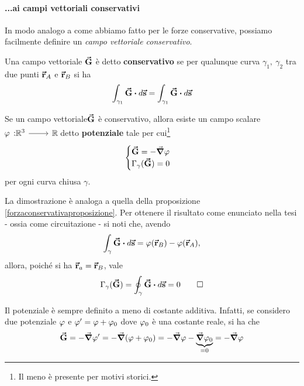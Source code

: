 \paragraph{...ai campi vettoriali conservativi}
In modo analogo a come abbiamo fatto per le forze conservative, possiamo facilmente definire un \textit{campo vettoriale conservativo}.
\begin{define}
	Una campo vettoriale $\vb*{\va{G}}$ è detto \textbf{conservativo} se per qualunque curva $\gamma_1,\ \gamma_2$ tra due punti $\vb*{\va{r}}_A$ e $\vb*{\va{r}}_B$ si ha
	\begin{equation}
		\int_{\gamma_1}\vba{G}\vdot d\vba{s}=\int_{\gamma_1}\vba{G}\vdot d\vba{s}
	\end{equation}
\end{define}
\begin{proposition}\label{campivettorialiconservativiproposizione} %
	Se un campo vettoriale$\vb*{\va{G}}$ è conservativo, allora esiste un campo scalare $\funz[\oldphi]{\realset^3}{\realset}$ detto \textbf{potenziale} tale per cui\footnote{Il meno è presente per motivi storici.}
	\begin{equation}
		\begin{cases}
			\vba{G}=-\grad{\oldphi}\\
			\Gamma_{\gamma}(\vba{G})=0
		\end{cases}
	\end{equation}
per ogni curva chiusa $\gamma$.
\end{proposition}
\begin{demonstration}
	La dimostrazione è analoga a quella della proposizione \ref{forzaconservativaproposizione}. Per ottenere il risultato come enunciato nella tesi - ossia come circuitazione - si noti che, avendo
	\begin{equation*}
		\int_{\gamma}\vba{G}\vdot d\vba{s}=\oldphi(\vba{r}_B)-\oldphi(\vba{r}_A),
	\end{equation*}
	allora, poiché si ha $\vb*{\va{r}}_a=\vb*{\va{r}}_B$, vale
	\begin{equation*}
		\Gamma_{\gamma}(\vba{G})=\oint_{\gamma}\vba{G}\vdot d\vba{s}=0\qedhere
	\end{equation*}
\end{demonstration}
\begin{observe}
	Il potenziale è sempre definito a meno di costante additiva. Infatti, se considero due potenziale $\oldphi$ e $\oldphi'=\oldphi+\oldphi_0$ dove $\oldphi_0$ è una costante reale, si ha che
	\begin{equation*}
		\vba{G}=-\grad{\oldphi'}=-\grad{(\oldphi+\oldphi_0)}=-\grad{\oldphi}-\underbrace{\grad{\oldphi_0}}_{=0}=-\grad{\oldphi}
	\end{equation*}
\end{observe}
